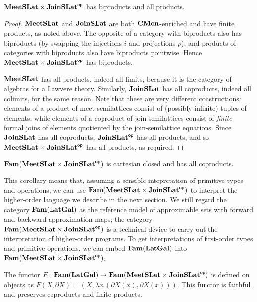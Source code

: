 \begin{proposition}
  $\mathbf{MeetSLat} \times \mathbf{JoinSLat}^{\mathsf{op}}$ has biproducts and all products.
\end{proposition}

\begin{proof}
  $\mathbf{MeetSLat}$ and $\mathbf{JoinSLat}$ are both $\mathbf{CMon}$-enriched and have
  finite products, as noted above. The opposite of a category with
  biproducts also has biproducts (by swapping the injections $i$ and
  projections $p$), and products of categories with biproducts also
  have biproducts pointwise. Hence $\mathbf{MeetSLat} \times \mathbf{JoinSLat}^{\mathsf{op}}$
  has biproducts.

  $\mathbf{MeetSLat}$ has all products, indeed all limits, because it is the
  category of algebras for a Lawvere theory. Similarly, $\mathbf{JoinSLat}$
  has all coproducts, indeed all colimits, for the same reason. Note
  that these are very different constructions: elements of a product
  of meet-semilattices consist of (possibly infinite) tuples of
  elements, while elements of a coproduct of join-semilattices consist
  of \emph{finite} formal joins of elements quotiented by the
  join-semilattice equations. Since $\mathbf{JoinSLat}$ has all coproducts,
  $\mathbf{JoinSLat}^{\mathsf{op}}$ has all products, and so
  $\mathbf{MeetSLat} \times \mathbf{JoinSLat}^{\mathsf{op}}$ has all products, as required.
\end{proof}

\begin{corollary}
  $\mathbf{Fam}(\mathbf{MeetSLat} \times \mathbf{JoinSLat}^{\mathsf{op}})$ is cartesian closed and has
  all coproducts.
\end{corollary}

This corollary means that, assuming a sensible intepretation of
primitive types and operations, we can use
$\mathbf{Fam}(\mathbf{MeetSLat} \times \mathbf{JoinSLat}^{\mathsf{op}})$ to interpret the higher-order
language we describe in the next section. We still regard the category
$\mathbf{Fam}(\mathbf{LatGal})$ as the reference model of approximable sets with
forward and backward approximation maps; the category
$\mathbf{Fam}(\mathbf{MeetSLat} \times \mathbf{JoinSLat}^{\mathsf{op}})$ is a technical device to carry
out the interpretation of higher-order programs. To get
interpretations of first-order types and primitive operations, we can
embed $\mathbf{Fam}(\mathbf{LatGal})$ into $\mathbf{Fam}(\mathbf{MeetSLat} \times \mathbf{JoinSLat}^{\mathsf{op}})$:

\begin{proposition}
  The functor
  $F : \mathbf{Fam}(\mathbf{LatGal}) \to \mathbf{Fam}(\mathbf{MeetSLat} \times \mathbf{JoinSLat}^{\mathsf{op}})$ is defined
  on objects as
  $F(X, \partial X) = (X, \lambda x. (\partial X(x), \partial
  X(x)))$. This functor is faithful and preserves coproducts and
  finite products.
\end{proposition}

